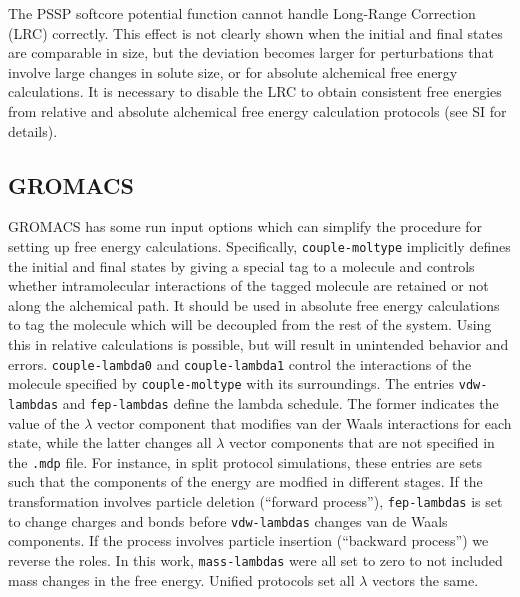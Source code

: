 \documentclass[journal=jctcce,manuscript=article]{achemso}
\newcommand{\inpopt}[1]{\texttt{#1}}
\begin{document}

The PSSP softcore potential function cannot handle Long-Range Correction (LRC) correctly. This effect is not clearly shown when the initial and final states are comparable in size, but the deviation becomes larger for perturbations that involve large changes in solute size, or for absolute alchemical free energy calculations. It is necessary to disable the LRC to obtain consistent free energies from relative and absolute alchemical free energy calculation protocols (see SI for details).




\subsection{GROMACS}
\label{sec:gromacs-results}

GROMACS has some run input options which can simplify the procedure 
for setting up free energy calculations.  Specifically, \inpopt{couple-moltype} 
implicitly defines the initial and final states by giving a special tag to a 
molecule and controls whether intramolecular interactions of the tagged 
molecule are retained or not along the alchemical path.  It should be used in 
absolute free energy calculations to tag the molecule which will be decoupled 
from the rest of the system.
Using this in relative calculations is possible, but will result in unintended 
behavior and errors.  \inpopt{couple-lambda0} and 
\inpopt{couple-lambda1} control the interactions of the molecule specified by 
\inpopt{couple-moltype} with its surroundings.
The entries \inpopt{vdw-lambdas} and \inpopt{fep-lambdas} 
define the lambda schedule.  The former indicates the value of the $\lambda$ 
vector component that modifies van der Waals interactions for each state,
while the latter changes all $\lambda$ vector components that are not specified 
in the \inpopt{.mdp} file.  For instance, in split protocol simulations, these 
entries are sets such that the components of the energy are modfied in 
different stages.  If the transformation involves particle deletion (``forward 
process''), \inpopt{fep-lambdas} is set to change charges and bonds
before \inpopt{vdw-lambdas} changes van de Waals components.
If the process involves particle insertion (``backward process'') we reverse 
the roles.  In this work, \inpopt{mass-lambdas} were all set to zero  to not 
included mass changes in the free energy.  Unified protocols set all $\lambda$ 
vectors the same.
\end{document}
